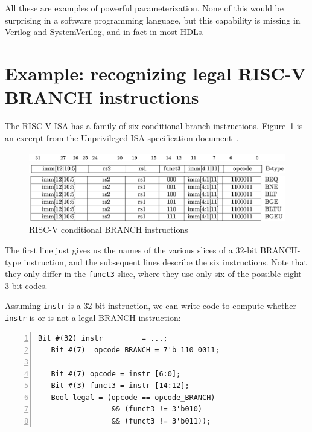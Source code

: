 All these are examples of powerful parameterization.  None of this
would be surprising in a software programming language, but this
capability is missing in Verilog and SystemVerilog, and in fact in
most HDLs.


\section{Example: recognizing legal RISC-V BRANCH instructions}

The RISC-V ISA has a family of six conditional-branch instructions.
Figure~\ref{Fig_Combo_BRANCH_instrs} is an excerpt from the Unprivileged ISA
specification document~\cite{RISCV_Unpriv_2019_12_13}.
\begin{figure}[htbp]
  \centerline{\includegraphics[width=6in,angle=0]{Figures/Fig_Combo_BRANCH_instrs_1}}
  \centerline{\includegraphics[width=6in,angle=0]{Figures/Fig_Combo_BRANCH_instrs_2}}
  \vspace{2mm}
  \centerline{\includegraphics[width=6in,angle=0]{Figures/Fig_Combo_BRANCH_instrs_3}}
  \caption{\label{Fig_Combo_BRANCH_instrs}RISC-V conditional BRANCH instructions}
\end{figure}
The first line just gives us the names of the various slices of a
32-bit BRANCH-type instruction, and the subsequent lines describe the
six instructions.  Note that they only differ in the \verb|funct3|
slice, where they use only six of the possible eight 3-bit codes.

Assuming \verb|instr| is a 32-bit instruction, we can write {\BSV} code
to compute whether \verb|instr| is or is not a legal BRANCH
instruction:

{\footnotesize
\begin{Verbatim}[frame=single, numbers=left]
   Bit #(32) instr         = ...;
   Bit #(7)  opcode_BRANCH = 7'b_110_0011;

   Bit #(7) opcode = instr [6:0];
   Bit #(3) funct3 = instr [14:12];
   Bool legal = (opcode == opcode_BRANCH)
                 && (funct3 != 3'b010)
                 && (funct3 != 3'b011));
\end{Verbatim}
}

